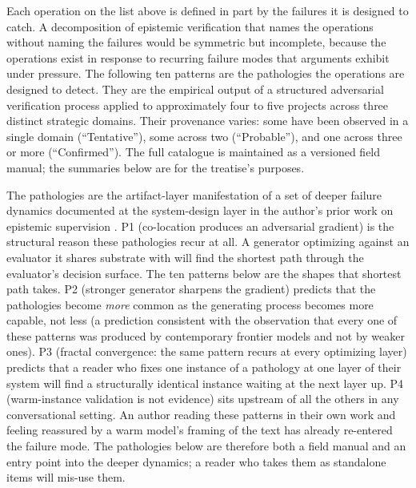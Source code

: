 \documentclass[11pt]{article}
\begin{document}
Each operation on the list above is defined in part by the failures it is designed to catch. A decomposition of epistemic verification that names the operations without naming the failures would be symmetric but incomplete, because the operations exist in response to recurring failure modes that arguments exhibit under pressure. The following ten patterns are the pathologies the operations are designed to detect. They are the empirical output of a structured adversarial verification process applied to approximately four to five projects across three distinct strategic domains. Their provenance varies: some have been observed in a single domain (``Tentative''), some across two (``Probable''), and one across three or more (``Confirmed''). The full catalogue is maintained as a versioned field manual; the summaries below are for the treatise's purposes.

The pathologies are the artifact-layer manifestation of a set of deeper failure dynamics documented at the system-design layer in the author's prior work on epistemic supervision \citep{alami2026c}. P1 (co-location produces an adversarial gradient) is the structural reason these pathologies recur at all. A generator optimizing against an evaluator it shares substrate with will find the shortest path through the evaluator's decision surface. The ten patterns below are the shapes that shortest path takes. P2 (stronger generator sharpens the gradient) predicts that the pathologies become \emph{more} common as the generating process becomes more capable, not less (a prediction consistent with the observation that every one of these patterns was produced by contemporary frontier models and not by weaker ones). P3 (fractal convergence: the same pattern recurs at every optimizing layer) predicts that a reader who fixes one instance of a pathology at one layer of their system will find a structurally identical instance waiting at the next layer up. P4 (warm-instance validation is not evidence) sits upstream of all the others in any conversational setting. An author reading these patterns in their own work and feeling reassured by a warm model's framing of the text has already re-entered the failure mode. The pathologies below are therefore both a field manual and an entry point into the deeper dynamics; a reader who takes them as standalone items will mis-use them.
\end{document}
